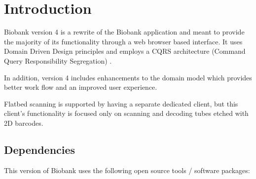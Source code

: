 \chapter{Introduction}

Biobank version 4 is a rewrite of the Biobank application and meant to provide
the majority of its functionality through a web browser based interface. It
uses Domain Driven Design principles \cite{evans2004domain} and employs a CQRS
architecture (Command Query Responsibility Segregation)
\cite{vernon2013implementing}.

In addition, version 4 includes enhancements to the domain model which provides
better work flow and an improved user experience.

Flatbed scanning is supported by having a separate dedicated client, but this
client's functionality is focused only on scanning and decoding tubes etched
with 2D barcodes.

\section{Dependencies}

This version of Biobank uses the following open source tools / software packages:

